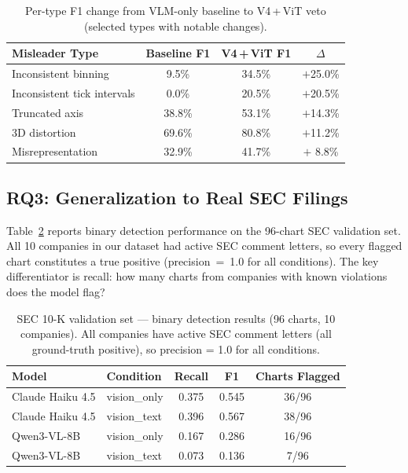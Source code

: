 \begin{table}[h]
  \centering
  \caption{Per-type F1 change from VLM-only baseline to V4\,+\,ViT veto (selected types with notable changes).}
  \label{tab:pertype_improvement}
  \small
  \begin{tabular}{lccc}
    \toprule
    Misleader Type & Baseline F1 & V4\,+\,ViT F1 & $\Delta$ \\
    \midrule
    Inconsistent binning        & 9.5\%  & 34.5\% & $+$25.0\% \\
    Inconsistent tick intervals & 0.0\%  & 20.5\% & $+$20.5\% \\
    Truncated axis              & 38.8\% & 53.1\% & $+$14.3\% \\
    3D distortion               & 69.6\% & 80.8\% & $+$11.2\% \\
    Misrepresentation           & 32.9\% & 41.7\% & $+$ 8.8\% \\
    \bottomrule
  \end{tabular}
\end{table}

\subsection{RQ3: Generalization to Real SEC Filings}
\label{sec:rq3}

Table~\ref{tab:sec_main} reports binary detection performance on the 96-chart SEC validation set. All 10 companies in our dataset had active SEC comment letters, so every flagged chart constitutes a true positive (precision~=~1.0 for all conditions). The key differentiator is recall: how many charts from companies with known violations does the model flag?

\begin{table}[h]
  \centering
  \caption{SEC 10-K validation set --- binary detection results (96 charts, 10 companies). All companies have active SEC comment letters (all ground-truth positive), so precision = 1.0 for all conditions.}
  \label{tab:sec_main}
  \small
  \begin{tabular}{llccc}
    \toprule
    Model & Condition & Recall & F1 & Charts Flagged \\
    \midrule
    Claude Haiku 4.5 & vision\_only & 0.375 & 0.545 & 36/96 \\
    Claude Haiku 4.5 & vision\_text & 0.396 & 0.567 & 38/96 \\
    Qwen3-VL-8B      & vision\_only & 0.167 & 0.286 & 16/96 \\
    Qwen3-VL-8B      & vision\_text & 0.073 & 0.136 & 7/96  \\
    \bottomrule
  \end{tabular}
\end{table}

